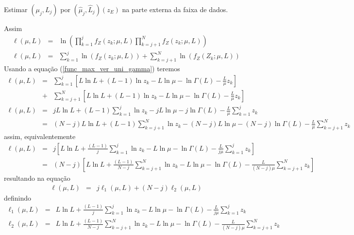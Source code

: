 \documentclass[remotesensing,article,submit,moreauthors,pdftex]{Definitions/mdpi}
\begin{document}
Estimar $(\mu_j, L_j )$ por $(\hat{\mu}_j, \hat{L}_j)(z_E)$ na parte externa da faixa de dados.


Assim
\begin{equation}\label{cap_acf_16}
\begin{array}{ccc}
 \ell(\mu, L)&=&\ln\left(\prod_{k=1}^{j}f_{Z}(z_k;\mu,L)\prod_{k=j+1}^{N}f_{Z}(z_k;\mu,L)\right)\\
 \ell(\mu, L)&=&\sum_{k=1}^{j}\ln\left(f_{Z}(z_k;\mu,L)\right)+\sum_{k=j+1}^{N}\ln\left(f_{Z}(Z_k;\mu,L)\right)
 \end{array}
 \end{equation}
Usando a equação (\ref{func_max_ver_uni_gamma}) teremos
\begin{equation}\nonumber
\begin{array}{ccc}
  \ell(\mu, L)&=&\sum_{k=1}^{j}\left[L\ln L +(L - 1) \ln z_k-L \ln \mu-\ln \Gamma(L) -\frac{L}{\mu} z_k\right]\\
              &+&\sum_{k=j+1}^{N}\left[L\ln L +(L - 1) \ln z_k-L \ln \mu-\ln \Gamma(L) -\frac{L}{\mu} z_k\right]\\
  \ell(\mu, L)&=&jL\ln L+(L-1)\sum_{k=1}^{j}\ln z_k-jL\ln\mu-j\ln\Gamma(L) -\frac{L}{\mu}\sum_{k=1}^{j} z_k\\
              &=&(N-j)L\ln L+(L-1)\sum_{k=j+1}^{N}\ln z_k-(N-j)L\ln\mu-(N-j)\ln\Gamma(L) -\frac{L}{\mu}\sum_{k=j+1}^{N} z_k
 \end{array}
 \end{equation}
assim, equivalentemente 
 \begin{equation}\nonumber
\begin{array}{ccc}  
  \ell(\mu, L)&=&j\left[L\ln L+\frac{(L-1)}{j}\sum_{k=1}^{j}\ln z_k-L\ln\mu-\ln\Gamma(L) -\frac{L}{j\mu}\sum_{k=1}^{j} z_k\right]\\
              &=&(N-j)\left[L\ln L+\frac{(L-1)}{N-j}\sum_{k=j+1}^{N}\ln z_k-L\ln\mu-\ln\Gamma(L) -\frac{L}{(N-j)\mu}\sum_{k=j+1}^{N} z_k\right]
 \end{array}
 \end{equation}
 resultando na equação
\begin{equation}\nonumber
\begin{array}{ccc}  
  \ell(\mu, L)&=&j\ell_1(\mu, L) + (N - j)\ell_2(\mu, L)
 \end{array}
 \end{equation}
definindo
 \begin{equation}
\begin{array}{ccc}\label{func_l_param_1_2}
    \ell_1(\mu, L)&=&L\ln L+\frac{(L-1)}{j}\sum_{k=1}^{j}\ln z_k-L\ln\mu-\ln\Gamma(L) -\frac{L}{j\mu}\sum_{k=1}^{j} z_k\\
    \ell_2(\mu, L)&=&L\ln L+\frac{(L-1)}{N-j}\sum_{k=j+1}^{N}\ln z_k-L\ln\mu-\ln\Gamma(L) -\frac{L}{(N-j)\mu}\sum_{k=j+1}^{N} z_k
 \end{array}
 \end{equation}
 
\end{document}
